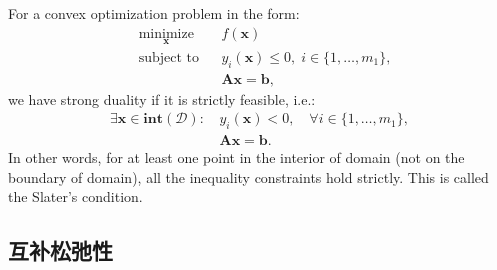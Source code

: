 \documentclass[lang=cn,10pt]{gorgeousnbook}
\numberwithin{equation}{section}%
\numberwithin{figure}{section}%
\begin{document}
\begin{lemma}
For a convex optimization problem in the form: 
\begin{equation}\label{equation_optimization_problem_inequalityConstraints_Ax_equals_b_constraint}
\begin{aligned}
& \underset{\boldsymbol{x}}{\text{minimize}}
& & f(\boldsymbol{x}) \\
& \text{subject to}
& & y_i(\boldsymbol{x}) \leq 0, \; i \in \{1, \ldots, m_1\}, \\
& & & \boldsymbol{Ax} = \boldsymbol{b}, 
\end{aligned}
\end{equation}
we have strong duality if it is strictly feasible, i.e.:
\begin{equation}
\begin{aligned}
\exists \boldsymbol{x} \in \textbf{int}(\mathcal{D}):\, & y_i(\boldsymbol{x}) < 0, \quad \forall i \in \{1, \dots, m_1\}, \\
& \boldsymbol{Ax} = \boldsymbol{b}.
\end{aligned}
\end{equation}
In other words, for at least one point in the interior of domain (not on the boundary of domain), all the inequality constraints hold strictly. This is called the Slater's condition. 
\end{lemma}

\subsection{互补松弛性}
\end{document}
